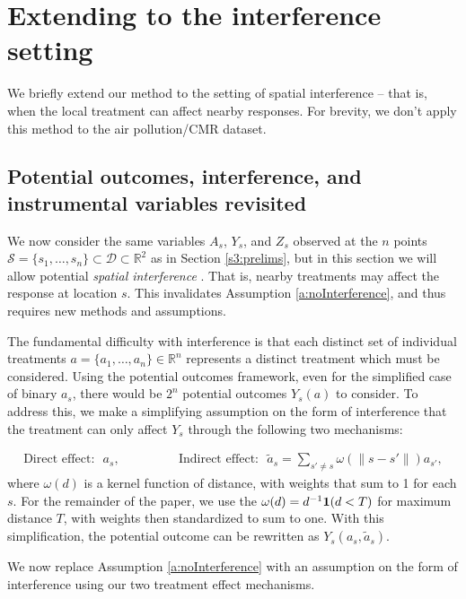 \documentclass[12pt]{article}
\begin{document}
\section{Extending to the interference setting}\label{s3:introInterference}

We briefly extend our method to the setting of spatial interference -- that is, when the local treatment can affect nearby responses. For brevity, we don't apply this method to the air pollution/CMR dataset. 

\subsection{Potential outcomes, interference, and instrumental variables revisited}\label{ss3:prelimsInterference}

We now consider the same variables $A_s$, $Y_s$, and $Z_s$ observed at the $n$ points $\mathcal{S} = \{s_1, \ldots, s_n\} \subset \mathcal{D} \subset \mathbb{R}^2$ as in Section \ref{s3:prelims}, but in this section we will allow potential \emph{spatial interference} \citep{giffin2020generalized, reich2020review}.  That is, nearby treatments may affect the response at location $s$.  This invalidates Assumption \ref{a:noInterference}, and thus requires new methods and assumptions.

The fundamental difficulty with interference is that each distinct set of individual treatments $a = \{a_1,\ldots,a_n\}\in \mathbb{R}^n$ represents a distinct treatment which must be considered. Using the potential outcomes framework, even for the simplified case of binary $a_s$, there would be $2^n$ potential outcomes $Y_s(a)$ to consider. To address this, we make a simplifying assumption on the form of interference that the treatment can only affect $Y_s$ through the following two mechanisms:

\begin{align}
    \text{Direct effect:}~~~a_s, \qquad \qquad ~~~
    \text{Indirect effect:}~~~\tilde{a}_s = \sum_{s' \ne s }
    \omega \left( \| s-s' \| \right)
    a_{s'},
\end{align}
where $\omega(d)$ is a kernel function of distance, with weights that sum to 1 for each $s$. For the remainder of the paper, we use the $\omega(d) = d^{-1} \mathbf{1}(d < T)$ for maximum distance $T$, with weights then standardized to sum to one. With this simplification, the potential outcome can be rewritten as $Y_s(a_s, \tilde{a}_s)$. 

We now replace Assumption \ref{a:noInterference} with an assumption on the form of interference using our two treatment effect mechanisms. 
\end{document}
